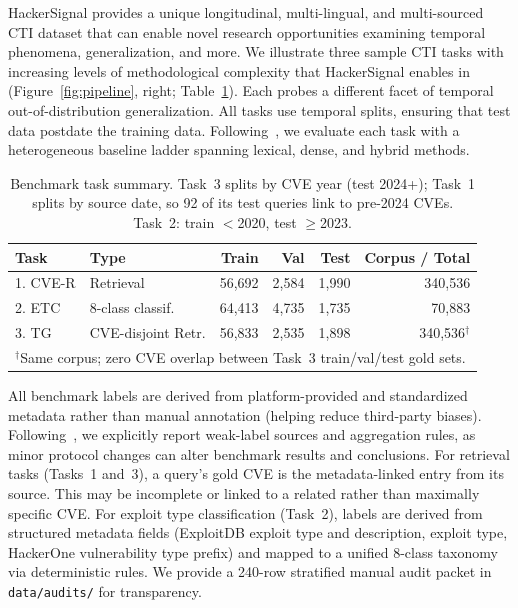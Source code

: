 \documentclass{article}
\begin{document}
HackerSignal provides a unique longitudinal, multi-lingual, and multi-sourced CTI dataset that can enable novel research opportunities examining temporal phenomena, generalization, and more. We illustrate three sample CTI tasks with increasing levels of methodological complexity that HackerSignal enables in (Figure~\ref{fig:pipeline}, right; Table~\ref{tab:task-summary}). Each probes a different facet of temporal out-of-distribution generalization. All tasks use temporal splits, ensuring that test data postdate the training data. Following~\citet{thakur2021beir}, we evaluate each task with a heterogeneous baseline ladder spanning lexical, dense, and hybrid methods.

\begin{table}[t]
\centering
\small
\caption{Benchmark task summary. Task~3 splits by CVE year (test 2024+); Task~1 splits by source date, so 92 of its test queries link to pre-2024 CVEs. Task~2: train $<$2020, test $\geq$2023.}
\label{tab:task-summary}
\begin{tabular}{llrrrr}
\toprule
\textbf{Task} & \textbf{Type} & \textbf{Train} & \textbf{Val} & \textbf{Test} & \textbf{Corpus / Total} \\
\midrule
1. CVE-R & Retrieval & 56,692 & 2,584 & 1,990 & 340,536 \\
2. ETC & 8-class classif. & 64,413 & 4,735 & 1,735 & 70,883 \\
3. TG & CVE-disjoint Retr. & 56,833 & 2,535 & 1,898 & 340,536$^\dagger$ \\
\bottomrule
\multicolumn{6}{l}{\footnotesize $^\dagger$Same corpus; zero CVE overlap between Task~3 train/val/test gold sets.}
\end{tabular}
\end{table}

All benchmark labels are derived from platform-provided and standardized metadata rather than manual annotation (helping reduce third-party biases). Following~\citet{zhang2021wrench}, we explicitly report weak-label sources and aggregation rules, as minor protocol changes can alter benchmark results and conclusions. For retrieval tasks (Tasks~1 and~3), a query's gold CVE is the metadata-linked entry from its source. This may be incomplete or linked to a related rather than maximally specific CVE. For exploit type classification (Task~2), labels are derived from structured metadata fields (ExploitDB exploit type and description, exploit type, HackerOne vulnerability type prefix) and mapped to a unified 8-class taxonomy via deterministic rules. We provide a 240-row stratified manual audit packet in \texttt{data/audits/} for transparency.
\end{document}
